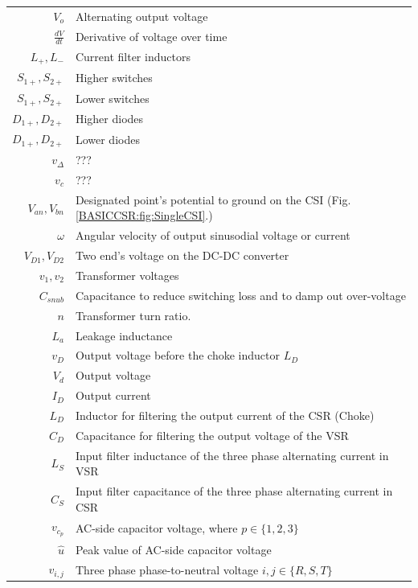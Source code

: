 \begin{tabularx}{\textwidth}{r|l}
	$V_o$															& Alternating output voltage\\
	$\frac{dV}{dt}$										& Derivative of voltage over time\\
	$L_+,L_-$													& Current filter inductors\\
	$S_{1+},S_{2+}$										& Higher switches\\
	$S_{1+},S_{2+}$										& Lower switches\\
	$D_{1+},D_{2+}$										& Higher diodes\\
	$D_{1+},D_{2+}$										& Lower diodes\\
	$v_\Delta$												& ???\\
	$v_c$															& ???\\
	$V_{an},V_{bn}$  									& Designated point's potential to ground on the CSI (Fig.\ref{BASICCSR:fig:SingleCSI}.)\\
	$\omega$													& Angular velocity of output sinusodial voltage or current\\
	$V_{D1},V_{D2}$ 									& Two end's voltage on the DC-DC converter\\
	$v_1,v_2$                         & Transformer voltages\\
	$C_{snub}$ 												& Capacitance to reduce switching loss and to damp out over-voltage\\
	$n$ 															& Transformer turn ratio.\\
	$L_a$															& Leakage inductance\\
	$v_D$															& Output voltage before the choke inductor $L_D$\\
	$V_d$															& Output voltage\\
	$I_D$															& Output current\\
	$L_D$															& Inductor for filtering the output current of the CSR (Choke)\\ 
	$C_D$															& Capacitance for filtering the output voltage of the VSR\\ 
	$L_S$															& Input filter inductance of the three phase alternating current in VSR\\
	$C_S$															& Input filter capacitance of the three phase alternating current in CSR\\
	$v_{c_p}$													& AC-side capacitor voltage, where $p\in\{1,2,3\}$\\
	$\widehat{u}$											& Peak value of AC-side capacitor voltage\\
	$v_{i,j}$													& Three phase phase-to-neutral voltage $i,j\in\{R,S,T\}$\\

\end{tabularx}
